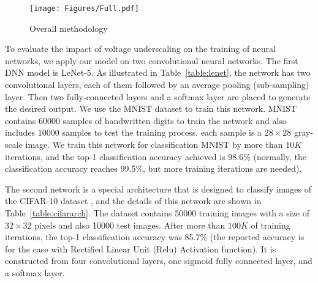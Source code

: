 \documentclass[conference]{IEEEtran}
\begin{document}
\color{black}


  \begin{figure}[!t]
\centerline{\texttt{[image: Figures/Full.pdf]}}
\caption{Overall methodology}
\label{fig:full}
\end{figure}

 To evaluate the impact of voltage underscaling on the training of neural networks, we apply our model on two convolutional neural networks. The first DNN model is LeNet-5\cite{lenet}. As illustrated in Table~\ref{table:lenet}, the network has two convolutional layers, each of them followed by an average pooling (sub-sampling) layer. Then two fully-connected layers and a softmax layer are placed to generate the desired output. We use the MNIST dataset \cite{mnist} to train this network. MNIST contains 60000 samples of handwritten digits to train the network and also includes 10000 samples to test the training process. each sample is a $28 \times 28 $ gray-scale image. We train this network for classification MNIST by more than $10K$ iterations, and the top-1 classification accuracy achieved is 98.6\% (normally, the classification accuracy reaches 99.5\%, but more training iterations are needed). \color{black}


The second network is a special architecture that is designed to classify images of the CIFAR-10 dataset \cite{cifar10}, and the details of this network are shown in Table~\ref{table:cifararch}. The dataset contains 50000 training images with a size of $32 \times 32$ pixels and also 10000 test images. After more than $100K$ of training iterations, the top-1 classification accuracy was 85.7\% (the reported accuracy is for the case with Rectified Linear Unit (Relu) Activation function).\color{black} It is constructed from four convolutional layers, one sigmoid fully connected layer, and a softmax layer. 
\color{black}
\end{document}
